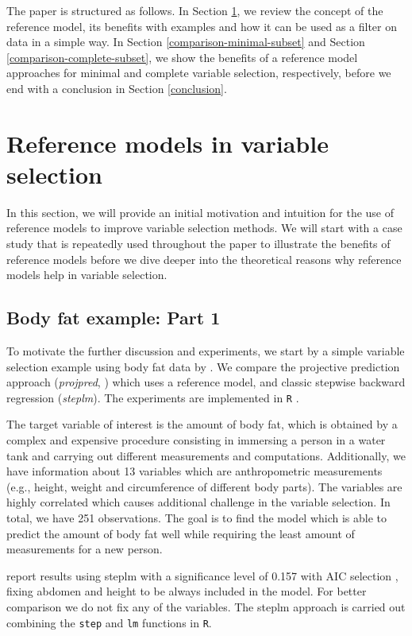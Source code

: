 \documentclass[a4]{article}
\theoremstyle{definition}
\begin{document}
The paper is structured as follows. In Section
\ref{ref-intro}, we review the concept of the reference
model, its benefits with examples and how it can be used as a filter
on data in a simple way. In Section \ref{comparison-minimal-subset} and 
Section \ref{comparison-complete-subset}, we show the
benefits of a reference model approaches for minimal and complete 
variable selection, respectively, before we end with a conclusion in Section \ref{conclusion}.

\section{Reference models in variable selection}
\label{ref-intro}

In this section, we will provide an initial motivation and intuition 
for the use of reference models to improve variable selection methods.
We will start with a case study that is repeatedly used throughout
the paper to illustrate the benefits of reference models before we dive deeper
into the theoretical reasons why reference models help in variable selection.

\subsection{Body fat example: Part 1}
\label{bodyfat-1}

To motivate the further discussion and experiments, we start by a simple
variable selection example using body fat data by \citet{johnson1996fitting}.
We compare the projective prediction approach (\emph{projpred},
\citet{paper:projpred}) which uses a reference model, and classic
stepwise backward regression (\emph{steplm}).
The experiments are implemented in \texttt{R} \citep{Rcore2018}.

The target variable of interest is the amount of body fat, which is
obtained by a complex and expensive procedure consisting in immersing a 
person in a water tank and carrying out different measurements and computations. 
Additionally, we have information about 13
variables which are anthropometric measurements (e.g., height, weight
and circumference of different body parts). The
variables are highly correlated which causes additional
challenge in the variable selection. In total, we have 251
observations. The goal is to find the model which is able to predict
the amount of body fat well while requiring the least amount of
measurements for a new person.

\cite{paper:bodyfat} report results using steplm with a significance
level of 0.157 with AIC selection \citep{akaike1974new}, fixing
abdomen and height to be always included in the model. For better
comparison we do not fix any of the variables.  The steplm approach is
carried out combining the \texttt{step} and \texttt{lm} functions in \texttt{R}.
\end{document}
